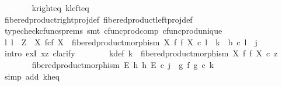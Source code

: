 \begin{isabellebody}
\ \ \ \ \ \ \isamarkupfalse%
\ k{\isacharunderscore}{\kern0pt}right{\isacharunderscore}{\kern0pt}eq\ k{\isacharunderscore}{\kern0pt}left{\isacharunderscore}{\kern0pt}eq\isanewline
\ \ \ \ \ \ \isamarkupfalse%
\ fibered{\isacharunderscore}{\kern0pt}product{\isacharunderscore}{\kern0pt}right{\isacharunderscore}{\kern0pt}proj{\isacharunderscore}{\kern0pt}def\ fibered{\isacharunderscore}{\kern0pt}product{\isacharunderscore}{\kern0pt}left{\isacharunderscore}{\kern0pt}proj{\isacharunderscore}{\kern0pt}def\isanewline
\ \ \ \ \ \ \isamarkupfalse%
\ {\isacharparenleft}{\kern0pt}typecheck{\isacharunderscore}{\kern0pt}cfuncs{\isacharunderscore}{\kern0pt}prems{\isacharcomma}{\kern0pt}\ smt\ cfunc{\isacharunderscore}{\kern0pt}prod{\isacharunderscore}{\kern0pt}comp\ cfunc{\isacharunderscore}{\kern0pt}prod{\isacharunderscore}{\kern0pt}unique{\isacharparenright}{\kern0pt}\isanewline
\isanewline
\ \ \ \ \isamarkupfalse%
\ \isamarkupfalse%
\ {\isachardoublequoteopen}{\isasymexists}l{\isachardot}{\kern0pt}\ l\ {\isacharcolon}{\kern0pt}\ Z\ {\isasymrightarrow}\ X\ \isactrlbsub f\isactrlesub {\isasymtimes}\isactrlsub c\isactrlbsub f\isactrlesub \ X\ {\isasymand}\ fibered{\isacharunderscore}{\kern0pt}product{\isacharunderscore}{\kern0pt}morphism\ X\ f\ f\ X\ {\isasymcirc}\isactrlsub c\ l\ {\isacharequal}{\kern0pt}\ k\ {\isasymand}\ b\ {\isasymcirc}\isactrlsub c\ l\ {\isacharequal}{\kern0pt}\ j{\isachardoublequoteclose}\isanewline
\ \ \ \ \isamarkupfalse%
\ {\isacharparenleft}{\kern0pt}intro\ exI{\isacharbrackleft}{\kern0pt}\ x{\isacharequal}{\kern0pt}z{\isacharbrackright}{\kern0pt}{\isacharcomma}{\kern0pt}\ clarify{\isacharparenright}{\kern0pt}\isanewline
\ \ \ \ \ \ \isamarkupfalse%
\ k{\isacharunderscore}{\kern0pt}def{\isacharcolon}{\kern0pt}\ {\isachardoublequoteopen}k\ {\isacharequal}{\kern0pt}\ fibered{\isacharunderscore}{\kern0pt}product{\isacharunderscore}{\kern0pt}morphism\ X\ f\ f\ X\ {\isasymcirc}\isactrlsub c\ z{\isachardoublequoteclose}\isanewline
\ \ \ \ \ \ \isamarkupfalse%
\ {\isachardoublequoteopen}fibered{\isacharunderscore}{\kern0pt}product{\isacharunderscore}{\kern0pt}morphism\ E\ h\ h\ E\ {\isasymcirc}\isactrlsub c\ j\ {\isacharequal}{\kern0pt}\ {\isacharparenleft}{\kern0pt}g\ {\isasymtimes}\isactrlsub f\ g{\isacharparenright}{\kern0pt}\ {\isasymcirc}\isactrlsub c\ k{\isachardoublequoteclose}\isanewline
\ \ \ \ \ \ \ \ \isamarkupfalse%
\ {\isacharparenleft}{\kern0pt}simp\ add{\isacharcolon}{\kern0pt}\ k{\isacharunderscore}{\kern0pt}h{\isacharunderscore}{\kern0pt}eq{\isacharparenright}{\kern0pt}\isanewline

\end{isabellebody}

